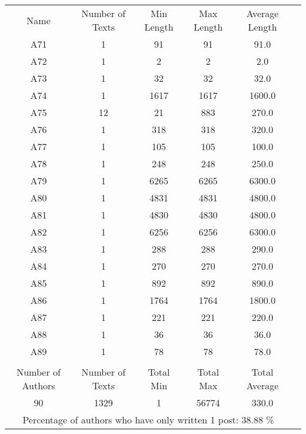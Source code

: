 \newpage
\begin{tabular}{cccccc}
 Name & Number of Texts & Min Length& Max Length & Average Length\\
A71 & 1 & 91 & 91 & 91.0\\
A72 & 1 & 2 & 2 & 2.0\\
A73 & 1 & 32 & 32 & 32.0\\
A74 & 1 & 1617 & 1617 & 1600.0\\
A75 & 12 & 21 & 883 & 270.0\\
A76 & 1 & 318 & 318 & 320.0\\
A77 & 1 & 105 & 105 & 100.0\\
A78 & 1 & 248 & 248 & 250.0\\
A79 & 1 & 6265 & 6265 & 6300.0\\
A80 & 1 & 4831 & 4831 & 4800.0\\
A81 & 1 & 4830 & 4830 & 4800.0\\
A82 & 1 & 6256 & 6256 & 6300.0\\
A83 & 1 & 288 & 288 & 290.0\\
A84 & 1 & 270 & 270 & 270.0\\
A85 & 1 & 892 & 892 & 890.0\\
A86 & 1 & 1764 & 1764 & 1800.0\\
A87 & 1 & 221 & 221 & 220.0\\
A88 & 1 & 36 & 36 & 36.0\\
A89 & 1 & 78 & 78 & 78.0\\
& & & & & \\ 
Number of Authors & Number of Texts & Total Min & Total Max & Total Average \\ 
90 & 1329 & 1 & 56774 & 330.0\\ 
\multicolumn{5}{c}{Percentage of authors who have only written 1 post: 38.88 \%}\end{tabular}

